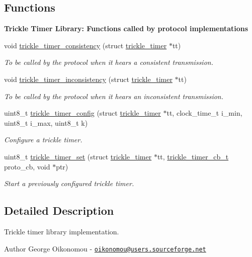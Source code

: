 \subsection*{Functions}
\begin{Indent}{\bf Trickle Timer Library\+: Functions called by protocol implementations}\par
\begin{DoxyCompactItemize}
\item 
void \hyperlink{group__trickle-timer_gaf7df1a3da4f9be5e2f17c3b77668eb6e}{trickle\+\_\+timer\+\_\+consistency} (struct \hyperlink{structtrickle__timer}{trickle\+\_\+timer} $\ast$tt)
\begin{DoxyCompactList}\small\item\em To be called by the protocol when it hears a consistent transmission. \end{DoxyCompactList}\item 
void \hyperlink{group__trickle-timer_gae401435f40030c5c4f0f49e813fd9afc}{trickle\+\_\+timer\+\_\+inconsistency} (struct \hyperlink{structtrickle__timer}{trickle\+\_\+timer} $\ast$tt)
\begin{DoxyCompactList}\small\item\em To be called by the protocol when it hears an inconsistent transmission. \end{DoxyCompactList}\item 
uint8\+\_\+t \hyperlink{group__trickle-timer_ga4b21d9fbed3c0c903fa1687b812a7f9c}{trickle\+\_\+timer\+\_\+config} (struct \hyperlink{structtrickle__timer}{trickle\+\_\+timer} $\ast$tt, clock\+\_\+time\+\_\+t i\+\_\+min, uint8\+\_\+t i\+\_\+max, uint8\+\_\+t k)
\begin{DoxyCompactList}\small\item\em Configure a trickle timer. \end{DoxyCompactList}\item 
uint8\+\_\+t \hyperlink{group__trickle-timer_ga57b03043f109c0b2adb1dc92637ee8b4}{trickle\+\_\+timer\+\_\+set} (struct \hyperlink{structtrickle__timer}{trickle\+\_\+timer} $\ast$tt, \hyperlink{group__trickle-timer_ga243193848d28e6373682b8bd2e25850a}{trickle\+\_\+timer\+\_\+cb\+\_\+t} proto\+\_\+cb, void $\ast$ptr)
\begin{DoxyCompactList}\small\item\em Start a previously configured trickle timer. \end{DoxyCompactList}\end{DoxyCompactItemize}
\end{Indent}


\subsection{Detailed Description}
Trickle timer library implementation. \begin{DoxyAuthor}{Author}
George Oikonomou -\/ \href{mailto:oikonomou@users.sourceforge.net}{\tt oikonomou@users.\+sourceforge.\+net} 
\end{DoxyAuthor}
